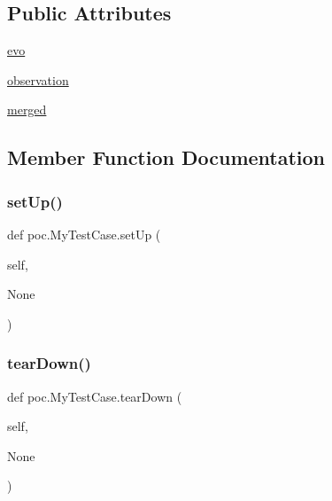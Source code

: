 \subsection*{Public Attributes}
\begin{DoxyCompactItemize}
\item 
\hyperlink{classpoc_1_1MyTestCase_a9c0d2d3cfd1e71d1cdbd801d04d975d0}{evo}
\item 
\hyperlink{classpoc_1_1MyTestCase_ac6deea9cfd5151cb19aa5ba0d0ed4aed}{observation}
\item 
\hyperlink{classpoc_1_1MyTestCase_a0a9daf6c9da79c7e301c36968bc58b65}{merged}
\end{DoxyCompactItemize}


\subsection{Member Function Documentation}
\mbox{\label{classpoc_1_1MyTestCase_a7ec60aeb38145ac607eac8c84e7771f1}} 
\subsubsection{\texorpdfstring{set\+Up()}{setUp()}}
{\footnotesize\ttfamily def poc.\+My\+Test\+Case.\+set\+Up (\begin{DoxyParamCaption}\item[{}]{self,  }\item[{}]{None }\end{DoxyParamCaption})}

\mbox{\label{classpoc_1_1MyTestCase_abb8f6d9181868c897d8c139944cd9526}} 
\subsubsection{\texorpdfstring{tear\+Down()}{tearDown()}}
{\footnotesize\ttfamily def poc.\+My\+Test\+Case.\+tear\+Down (\begin{DoxyParamCaption}\item[{}]{self,  }\item[{}]{None }\end{DoxyParamCaption})}

